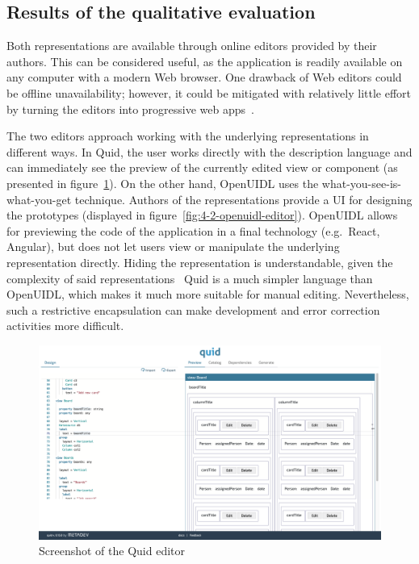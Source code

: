 \subsection{Results of the qualitative evaluation}\label{subsec:results-of-the-qualitative-evaluation}
Both representations are available through online editors provided by their authors.
This can be considered useful, as the application is readily available on any computer with a modern Web browser.
One drawback of Web editors could be offline unavailability;
however, it could be mitigated with relatively little effort by turning the editors into progressive web apps~.

The two editors approach working with the underlying representations in different ways.
In Quid, the user works directly with the description language and can immediately see the preview of the currently edited view or component (as presented in figure~\ref{fig:4-2-quid-editor}).
On the other hand, OpenUIDL uses the what-you-see-is-what-you-get technique.
Authors of the representations provide a UI for designing the prototypes (displayed in figure~\ref{fig:4-2-openuidl-editor}).
OpenUIDL allows for previewing the code of the application in a final technology (e.g.\ React, Angular), but does not let users view or manipulate the underlying representation directly.
Hiding the representation is understandable, given the complexity of said representations \textendash\ Quid is a much simpler language than OpenUIDL, which makes it much more suitable for manual editing.
Nevertheless, such a restrictive encapsulation can make development and error correction activities more difficult.

\begin{figure}
    \centering
    \includegraphics[width=\textwidth]{4-results-and-discussion/quid-editor}
    \caption{Screenshot of the Quid editor}
    \label{fig:4-2-quid-editor}
\end{figure}

